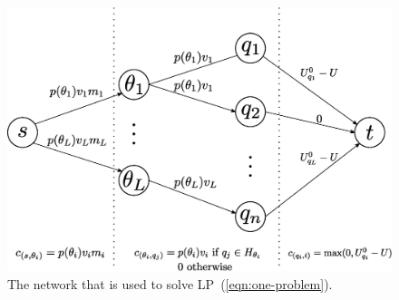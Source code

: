 \documentclass{article}
\begin{document}
\begin{figure}
\caption{The network that is used to solve LP~(\ref{eqn:one-problem}).}
\label{fig:network}
\includegraphics[width=\linewidth]{network}
\end{figure}
\end{document}
